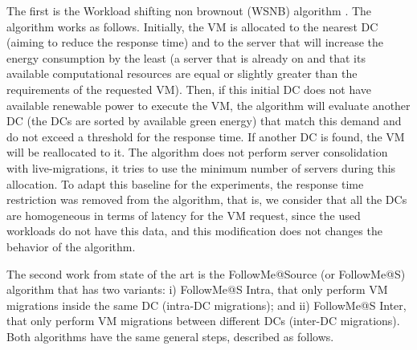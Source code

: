 The first is the Workload shifting non brownout (WSNB) algorithm
\cite{XU2020191}. The algorithm works as follows. Initially, the VM is allocated to the nearest DC (aiming to reduce the response time) and to the server that will increase the energy consumption by the least (a server that is already on and that its available computational resources are equal or slightly greater than the requirements of the requested VM). Then, if this initial DC does not have
available renewable power to execute the VM, the algorithm will evaluate another
DC (the DCs are sorted by available green energy) that match this
demand and do not exceed a threshold for the response time. If another
DC is found, the VM will be reallocated to it. The algorithm does not
perform server consolidation with live-migrations, it tries to use the minimum number of servers during this allocation. To adapt this baseline for the experiments, the response time restriction was removed from the
algorithm, that is, we consider that all the DCs are homogeneous in terms of latency for the VM request, since the used workloads do not have this data, and this modification does not changes the behavior of the algorithm.

The second work from state of the art is the FollowMe@Source (or FollowMe@S) algorithm \cite{ALI2021110907} that has two variants: i) FollowMe@S Intra, that only perform VM migrations inside the same DC (intra-DC migrations);  and ii) FollowMe@S Inter, that only perform VM migrations between different DCs (inter-DC migrations). Both algorithms have the same general steps, described as follows.


